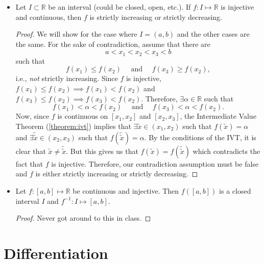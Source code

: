 \documentclass{article}
\newcommand{\R}{\mathbb{R}}
\newcommand{\?}{\stackrel{?}{=}}
\theoremstyle{definition} %
\begin{document}
\begin{itemize}
    \item[]
    \begin{proposition}
        Let $I \subset \R$ be an interval (could be closed, open, etc.). If $f: I \mapsto \R$ is injective and continuous, then $f$ is strictly increasing or strictly decreasing.
    \end{proposition}
    \begin{proof}
        We will show for the case where $I = (a, b)$ and the other cases are the same. For the sake of contradiction, assume that there are
        $$a < x_1 < x_2 < x_3 < b$$
        such that
        $$f(x_1) \leq f(x_2) \quad \text{ and } \quad f(x_3) \geq f(x_2),$$
        i.e., \textit{not} strictly increasing. Since $f$ is injective, $f(x_1) \leq f(x_2) \implies f(x_1) < f(x_2)$ and $f(x_3) \leq f(x_2) \implies f(x_3) < f(x_2)$. Therefore, $\exists \alpha \in \R$ such that
        $$f(x_1) < \alpha < f(x_2) \quad \text{ and } \quad f(x_3) < \alpha < f(x_2).$$
        Now, since $f$ is continuous on $[x_1, x_2]$ and $[x_2, x_3]$, the Intermediate Value Theorem (\ref{theorem:ivt}) implies that $\exists \widetilde{x} \in (x_1, x_2)$ such that $f(\widetilde{x}) = \alpha$ and $\exists \widetilde{\widetilde{x}} \in (x_2, x_3)$ such that $f(\widetilde{\widetilde{x}}) = \alpha$. By the conditions of the IVT, it is clear that $\widetilde{x} \neq \widetilde{\widetilde{x}}$. But this gives us that $f(\widetilde{x}) = f(\widetilde{\widetilde{x}})$ which contradicts the fact that $f$ is injective. Therefore, our contradiction assumption must be false and $f$ is either strictly increasing or strictly decreasing.
    \end{proof}
    \item[]
    \begin{theorem}
        Let $f: [a, b] \mapsto \R$ be continuous and injective. Then $f([a, b])$ is a closed interval $I$ and $f^{-1}: I \mapsto [a, b]$.
        \label{theorem:inverse_cont}
    \end{theorem}
    \begin{proof}
        Never got around to this in class.
    \end{proof}
\end{itemize}

\section{Differentiation}
\end{document}
